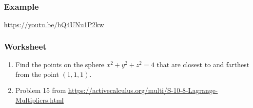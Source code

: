 \documentclass[aspectratio=169]{beamer}
\begin{document}
\begin{frame}
    \frametitle{Example}
    \url{https://youtu.be/hQ4UNu1P2kw}
\end{frame}

\begin{frame}
    \frametitle{Worksheet}
    \begin{enumerate}
        \item Find the points on the sphere $x^2 + y^2 + z^2 =4$
            that are closest to and farthest from the point 
            $(1,1,1)$.
        \item Problem 15 from \url{https://activecalculus.org/multi/S-10-8-Lagrange-Multipliers.html}
    \end{enumerate}
\end{frame}
\end{document}
